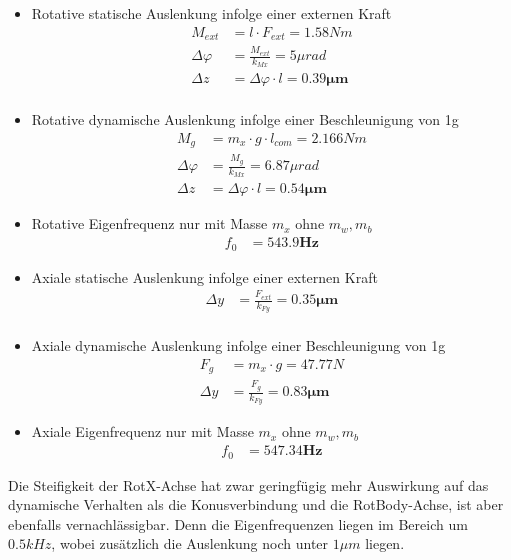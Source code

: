 \documentclass[10pt,a4paper]{iace.report}
\begin{document}
					\begin{itemize}
						\item Rotative statische Auslenkung infolge einer externen Kraft\\
						\begin{align*}
						M_{ext} &= l\cdot F_{ext} = 1.58Nm\\
						\Delta\varphi &= \frac{M_{ext}}{k_{Mx}} = 5\mu rad\\
						\Delta z &= \Delta\varphi\cdot l=\bm{0.39\mu m}\\   
						\end{align*}
						\item Rotative dynamische Auslenkung infolge einer Beschleunigung von 1g
						\begin{align*}
						M_g &=m_x\cdot g \cdot l_{com}= 2.166Nm\\ 
						\Delta\varphi &= \frac{M_{g}}{k_{Mx}} = 6.87\mu rad\\
						\Delta z&=\Delta\varphi\cdot l=\bm{0.54 \mu m}
						\end{align*}
						\item Rotative Eigenfrequenz nur mit Masse $  m_{x} $  ohne $  m_{w}, m_{b} $ \\
						\begin{align*}
						f_{0} &= \bm{543.9 Hz} 
						\end{align*}
						\item Axiale statische Auslenkung infolge einer externen Kraft\\
						\begin{align*}
						\Delta y &= \frac{F_{ext}}{k_{Fy}} = \bm{0.35\mu m}\\ 
						\end{align*}
						\item Axiale dynamische Auslenkung infolge einer Beschleunigung von 1g
						\begin{align*}
						F_g &=m_x\cdot g = 47.77N\\ 
						\Delta y &= \frac{F_{g}}{k_{Fy}} =\bm{ 0.83\mu m}
						\end{align*}
						\item Axiale Eigenfrequenz nur mit Masse $  m_{x} $  ohne $  m_{w}, m_{b} $ \\
						\begin{align*}
						f_{0} &= \bm{547.34 Hz} 
						\end{align*}
					\end{itemize}
					Die Steifigkeit der RotX-Achse hat zwar geringfügig mehr Auswirkung auf das dynamische Verhalten als die Konusverbindung und die RotBody-Achse, ist aber ebenfalls vernachlässigbar. Denn die Eigenfrequenzen liegen im Bereich um $ 0.5kHz $, wobei zusätzlich die Auslenkung noch unter $ 1\mu m $ liegen.  
					
\end{document}
